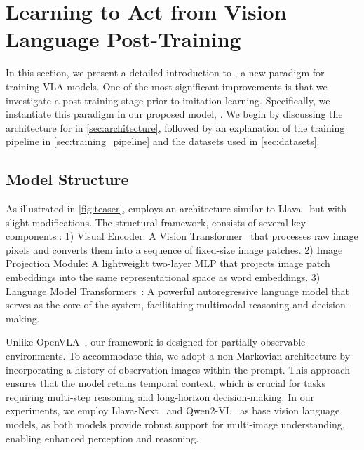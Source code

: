 \section{Learning to Act from Vision Language Post-Training}

In this section, we present a detailed introduction to \method, a new paradigm for training VLA models. One of the most significant improvements is that we investigate a post-training stage prior to imitation learning. Specifically, we instantiate this paradigm in our proposed model, \model. We begin by discussing the architecture for \model in \autoref{sec:architecture}, followed by an explanation of the training pipeline in \autoref{sec:training_pipeline} and the datasets used in \autoref{sec:datasets}. 

\subsection{Model Structure}\label{sec:architecture}

As illustrated in \autoref{fig:teaser}, \model employs an architecture similar to Llava~\citep{llavanext} but with slight modifications. The structural framework,  consists of several key components:: 1) Visual Encoder: A Vision Transformer~\citep{vit} that processes raw image pixels and converts them into a sequence of fixed-size image patches. 2) Image Projection Module: A lightweight two-layer MLP that projects image patch embeddings into the same representational space as word embeddings. 3) Language Model Transformers~\citep{llama,qwen}: A powerful autoregressive language model that serves as the core of the system, facilitating multimodal reasoning and decision-making.

Unlike OpenVLA~\citep{openVLA}, our framework is designed for partially observable environments. To accommodate this, we adopt a non-Markovian architecture by incorporating a history of observation images within the prompt. This approach ensures that the model retains temporal context, which is crucial for tasks requiring multi-step reasoning and long-horizon decision-making. In our experiments, we employ Llava-Next~\citep{llavanext} and Qwen2-VL~\citep{qwen2vl} as base vision language models, as both models provide robust support for multi-image understanding, enabling enhanced perception and reasoning.


